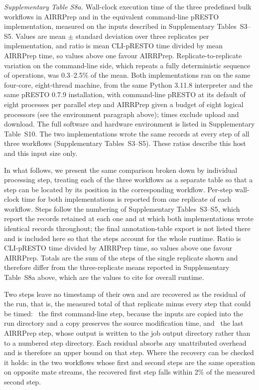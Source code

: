 \documentclass[11pt]{article}
\begin{document}
{\small\textit{Supplementary Table S8a.}
Wall-clock execution time of the three predefined bulk workflows in AIRRPrep
and in the equivalent command-line pRESTO implementation, measured on the
inputs described in Supplementary Tables~S3--S5. Values are mean $\pm$ standard
deviation over three replicates per implementation, and ratio is mean
CLI-pRESTO time divided by mean AIRRPrep time, so values above one favour
AIRRPrep. Replicate-to-replicate variation on the command-line side, which
repeats a fully deterministic sequence of operations, was 0.3--2.5\% of the
mean. Both implementations ran on the same four-core, eight-thread machine,
from the same Python 3.11.8 interpreter and the same pRESTO 0.7.9 installation,
with command-line pRESTO at its default of eight processes per parallel step
and AIRRPrep given a budget of eight logical processors (see the environment
paragraph above); times exclude upload and download. The full software and
hardware environment is listed in Supplementary Table~S10. The two
implementations wrote the same records at every step of all three workflows
(Supplementary Tables~S3--S5). These ratios describe this host and this input
size only.\par}

In what follows, we present the same comparison broken down by individual
processing step, treating each of the three workflows as a separate table so
that a step can be located by its position in the corresponding workflow.
Per-step wall-clock time for both implementations is reported from one
replicate of each workflow. Steps follow the numbering of Supplementary
Tables~S3--S5, which report the records retained at each one and at which
both implementations wrote identical records throughout; the final annotation-table
export is not listed there and is included here so that the steps account for
the whole runtime. Ratio is CLI-pRESTO time divided by AIRRPrep time, so
values above one favour AIRRPrep. Totals are the sum of the steps of the single
replicate shown and therefore differ from the three-replicate means reported in
Supplementary Table~S8a above, which are the values to cite for overall runtime.

Two steps leave no timestamp of their own and are recovered as the residual of
the run, that is, the measured total of that replicate minus every step that
could be timed: \dag~the first command-line step, because the inputs are copied
into the run directory and a copy preserves the source modification time, and
\ddag~the last AIRRPrep step, whose output is written to the job output
directory rather than to a numbered step directory. Each residual absorbs any
unattributed overhead and is therefore an upper bound on that step. Where the
recovery can be checked it holds: in the two workflows whose first and second
steps are the same operation on opposite mate streams, the recovered first
step falls within 2\% of the measured second step.
\end{document}
